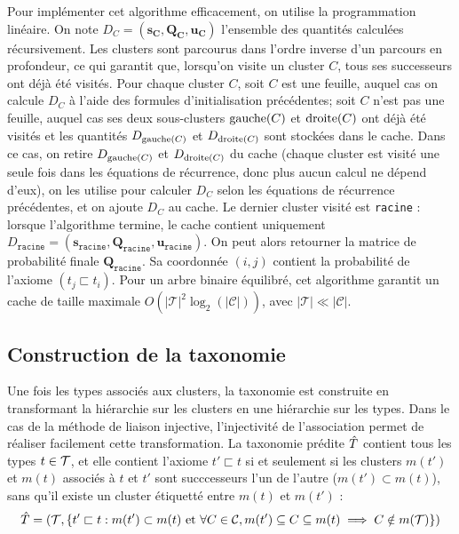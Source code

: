 Pour implémenter cet algorithme efficacement, on utilise la programmation linéaire. On note $D_C = (\mathbf{s_C}, \mathbf{Q_C}, \mathbf{u_C})$ l'ensemble des quantités calculées récursivement. Les clusters sont parcourus dans l'ordre inverse d'un parcours en profondeur, ce qui garantit que, lorsqu'on visite un cluster $C$, tous ses successeurs ont déjà été visités. Pour chaque cluster $C$, soit $C$ est une feuille, auquel cas on calcule $D_C$ à l'aide des formules d'initialisation précédentes; soit $C$ n'est pas une feuille, auquel cas ses deux sous-clusters $\gauche(C)$ et $\droite(C)$ ont déjà été visités et les quantités $D_{\gauche(C)}$ et $D_{\droite(C)}$ sont stockées dans le cache. Dans ce cas, on retire $D_{\gauche(C)}$ et $D_{\droite(C)}$ du cache (chaque cluster est visité une seule fois dans les équations de récurrence, donc plus aucun calcul ne dépend d'eux), on les utilise pour calculer $D_C$ selon les équations de récurrence précédentes, et on ajoute $D_C$ au cache. Le dernier cluster visité est \texttt{racine} : lorsque l'algorithme termine, le cache contient uniquement $D_\texttt{racine} = (\mathbf{s_\texttt{racine}}, \mathbf{Q_\texttt{racine}}, \mathbf{u_\texttt{racine}})$. On peut alors retourner la matrice de probabilité finale $\mathbf{Q_\texttt{racine}}$. Sa coordonnée $(i, j)$ contient la probabilité de l'axiome $(t_j \sqsubset t_i)$.
Pour un arbre binaire équilibré, cet algorithme garantit un cache de taille maximale $O(|\mathcal{T}|^2 \log_2(| \mathcal{C} |))$, avec $|\mathcal{T}| \ll | \mathcal{C} |$.


\subsection{Construction de la taxonomie}
\label{subsec:te-taxconstruction}

Une fois les types associés aux clusters, la taxonomie est construite en transformant la hiérarchie sur les clusters en une hiérarchie sur les types. Dans le cas de la méthode de liaison injective, l'injectivité de l'association permet de réaliser facilement cette transformation. La taxonomie prédite $\Tpred$ contient tous les types $t \in \cal{T}$, et elle contient l'axiome $t' \sqsubset t$ si et seulement si les clusters $m(t')$ et $m(t)$ associés à $t$ et $t'$ sont succcesseurs l'un de l'autre ($m(t') \subset m(t)$), sans qu'il existe un cluster étiquetté entre $m(t)$ et $m(t')$ :
\begin{equation}
    \Tpred = (\cal{T}, \{t' \sqsubset t : m(t') \subset m(t) \text{ et } \forall C \in \cal{C},  m(t') \subseteq C \subseteq m(t) \implies C \notin m(\cal{T}) \})
    \label{eq:te-extract-tax-from-mapping}
\end{equation}

